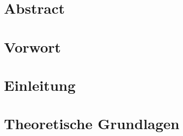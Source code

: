 \section*{Abstract}



\newpage


\section*{Vorwort}



\newpage


\tableofcontents 

\newpage 


\section{Einleitung} 



\newpage


\section{Theoretische Grundlagen} %



\newpage


